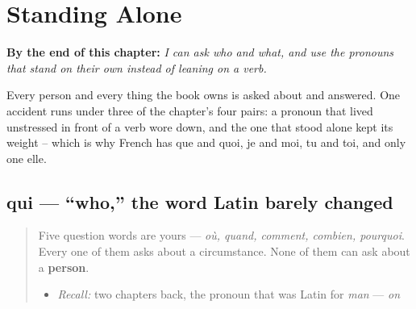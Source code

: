 
\chapter{Standing Alone}
\label{ch:fr-pronouns}

\begin{chapteropening}
\textbf{By the end of this chapter:} \emph{I can ask who and what, and use the pronouns that stand on their own instead of leaning on a verb.}

Every person and every thing the book owns is asked about and answered. One accident runs under three of the chapter's four pairs: a pronoun that lived unstressed in front of a verb wore down, and the one that stood alone kept its weight -- which is why French has que and quoi, je and moi, tu and toi, and only one elle.
\end{chapteropening}

\section[qui]{qui — \textquotedblleft{}who,\textquotedblright{} the word Latin barely changed}

\label{lesson:FR-C39-qui}



\begin{quote}
Five question words are yours — \emph{où, quand, comment, combien, pourquoi}. Every one of them asks about a circumstance. None of them can ask about a \textbf{person}.

\begin{itemize}
\raggedright
  \item \emph{Recall:} two chapters back, the pronoun that was Latin for \emph{man} — \emph{on}
\end{itemize}
\end{quote}

